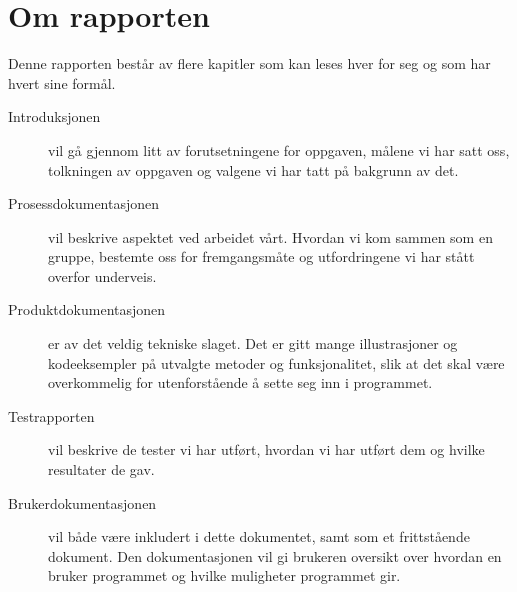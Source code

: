 \section{Om rapporten}
Denne rapporten består av flere kapitler som kan leses hver for seg og som har hvert sine formål.


\begin{description}

\item[Introduksjonen] vil gå gjennom litt av forutsetningene for oppgaven, målene vi har satt oss, tolkningen av oppgaven og valgene vi har tatt på bakgrunn av det. 

\item[Prosessdokumentasjonen] vil beskrive aspektet ved arbeidet vårt. Hvordan vi kom sammen som en gruppe, bestemte oss for fremgangsmåte og utfordringene vi har stått overfor underveis.

\item[Produktdokumentasjonen] er av det veldig tekniske slaget. Det er gitt mange illustrasjoner og kodeeksempler på utvalgte metoder og funksjonalitet, slik at det skal være overkommelig for utenforstående å sette seg inn i programmet.

\item[Testrapporten] vil beskrive de tester vi har utført, hvordan vi har utført dem og hvilke resultater de gav. 

\item[Brukerdokumentasjonen] vil både være inkludert i dette dokumentet, samt som et frittstående dokument. Den dokumentasjonen vil gi brukeren oversikt over hvordan en bruker programmet og hvilke muligheter programmet gir.

\end{description}